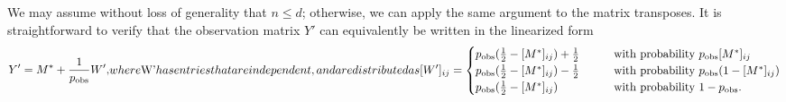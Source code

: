 \documentclass[11pt, hidelinks]{article} %
\newcommand{\half}{\ensuremath{{\frac{1}{2}}}}
\newcommand{\numrows}{n}
\newcommand{\numcols}{d}
\newcommand{\wtmatrix}{M}
\newcommand{\wtstar}{\wtmatrix^*}
\newcommand{\pp}{\ensuremath{p_{\mathrm{obs}}}}
\newcommand{\obs}{\ensuremath{Y}}
\newcommand{\noise}{W}
\begin{document}
We may assume without loss of generality that $\numrows \leq
\numcols$; otherwise, we can apply the same argument to the matrix
transposes.  It is straightforward to verify that the observation
matrix $\obs'$ can equivalently be written in the linearized form
\begin{subequations}
  \begin{align}
    \label{EqnDefnObsPrimeLowRank}
    \obs' = \wtstar + \frac{1}{\pp} \noise',
  \end{align}
where $\noise'$ has entries that are independent, and are distributed
as
\begin{align}
\label{EqnDefnWprimePartialLowRank}
[\noise']_{ij} = \begin{cases} \pp( \half - [\wtstar]_{ij}) +
  \frac{1}{2} & \qquad \mbox{with probability } \pp [\wtstar]_{ij}\\
%
      \pp (\half - [\wtstar]_{ij}) - \frac{1}{2} & \qquad \mbox{with
	probability } \pp (1-[\wtstar]_{ij})\\ 
%
      \pp (\half - [\wtstar]_{ij}) & \qquad \mbox{with probability } 1-\pp .
    \end{cases}
  \end{align}
\end{subequations}
\end{document}

